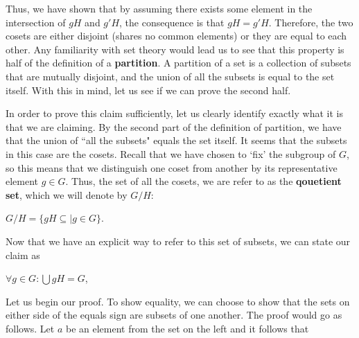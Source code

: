 \documentclass[12pt, a4paper]{article}
\begin{document}
    Thus, we have shown that by assuming there exists some element in the intersection of $gH$ and $g'H$, the consequence is that $gH=g'H$. Therefore, the two cosets are either disjoint (shares no common elements) or they are equal to each other. Any familiarity with set theory would lead us to see that this property is half of the definition of a \textbf{partition}. A partition of a set is a collection of subsets that are mutually disjoint, and the union of all the subsets is equal to the set itself. With this in mind, let us see if we can prove the second half.\par
    
    In order to prove this claim sufficiently, let us clearly identify exactly what it is that we are claiming. By the second part of the definition of partition, we have that the union of ``all the subsets" equals the set itself. It seems that the subsets in this case are the cosets. Recall that we have chosen to `fix' the subgroup of $G$, so this means that we distinguish one coset from another by its representative element $g\in G$. Thus, the set of all the cosets, we are refer to as the \textbf{qouetient set}, which we will denote by $G/H$:\par
    
\vspace{4mm}

        \centerline{$G/H=\{gH\subseteq\mid g\in G\}$.}
        
\vspace{4mm}

    Now that we have an explicit way to refer to this set of subsets, we can state our claim as\par
    
\vspace{4mm}

        \centerline{$\forall g\in G\colon$\large{$\bigcup$}\normalsize$gH=G$,}
        
\vspace{4mm}

    Let us begin our proof. To show equality, we can choose to show that the sets on either side of the equals sign are subsets of one another. The proof would go as follows. Let $a$ be an element from the set on the left and it follows that\par
    
\vspace{8mm}
\end{document}
